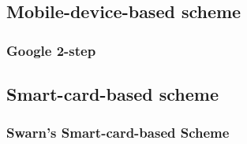\begin{CJK}{Bg5}{bsmi}
\subsection{Mobile-device-based scheme}

\subsubsection{Google 2-step}

\subsection{Smart-card-based scheme}

\subsubsection{Swarn's Smart-card-based Scheme}

\end{CJK}